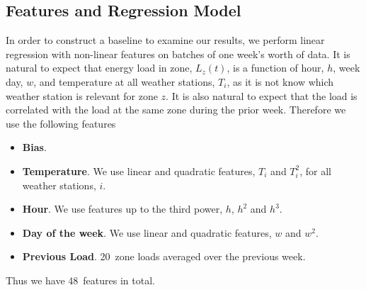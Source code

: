 \documentclass{article} %
\begin{document}
\subsection{Features and Regression Model}
\label{sec:energy/reg}

In order to construct a baseline to examine our results, we perform 
linear regression with non-linear features on batches of one week's worth of data.
It is natural to expect that energy load in zone, $L_z(t)$, 
is a function of 
hour, $h$, week day, $w$, and temperature at all weather stations, $T_i$,
as it is not know which weather station is relevant for zone $z$.
It is also natural to expect that the load is correlated with the load 
at the same zone during the prior week.
Therefore we use the following features
\begin{itemize}
	\item {\bf Bias}.
	\item {\bf Temperature}. We use linear and quadratic features, $T_i$ 
	and $T_i^2$, for all weather stations, $i$.
	\item {\bf Hour}. We use features up to the third power, $h$, $h^2$
	and $h^3$.
	\item {\bf Day of the week}. We use linear and quadratic features,
	$w$ and $w^2$.
	\item {\bf Previous Load}. 20~zone loads averaged over the previous week.
\end{itemize}
Thus we have 48~features in total.
\end{document}

